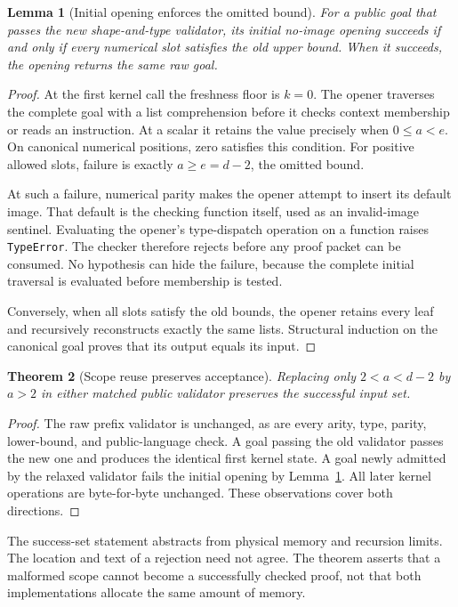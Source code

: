 \documentclass[11pt]{article}
\newtheorem{theorem}{Theorem}[section]
\newtheorem{lemma}[theorem]{Lemma}
\theoremstyle{definition}\newtheorem{definition}[theorem]{Definition}
\theoremstyle{remark}\newtheorem{remark}[theorem]{Remark}
\begin{document}
\begin{lemma}[Initial opening enforces the omitted bound]
\label{lem:scope}
For a public goal that passes the new shape-and-type validator, its
initial no-image opening succeeds if and only if every numerical slot
satisfies the old upper bound. When it succeeds, the opening returns the
same raw goal.
\end{lemma}
\begin{proof}
At the first kernel call the freshness floor is $k=0$. The opener
traverses the complete goal with a list comprehension before it checks
context membership or reads an instruction. At a scalar it retains the
value precisely when $0\leq a<e$. On canonical numerical positions,
zero satisfies this condition. For positive allowed slots, failure is
exactly $a\geq e=d-2$, the omitted bound.

At such a failure, numerical parity makes the opener attempt to insert
its default image. That default is the checking function itself, used
as an invalid-image sentinel. Evaluating the opener's type-dispatch
operation on a function raises \texttt{TypeError}. The checker therefore
rejects before any proof packet can be consumed. No hypothesis can
hide the failure, because the complete initial traversal is evaluated
before membership is tested.

Conversely, when all slots satisfy the old bounds, the opener retains
every leaf and recursively reconstructs exactly the same lists. Structural
induction on the canonical goal proves that its output equals its input.
\end{proof}

\begin{theorem}[Scope reuse preserves acceptance]
Replacing only $2<a<d-2$ by $a>2$ in either matched public validator
preserves the successful input set.
\end{theorem}
\begin{proof}
The raw prefix validator is unchanged, as are every arity, type, parity,
lower-bound, and public-language check. A goal passing the old validator
passes the new one and produces the identical first kernel state. A goal
newly admitted by the relaxed validator fails the initial opening by
Lemma~\ref{lem:scope}. All later kernel operations are byte-for-byte
unchanged. These observations cover both directions.
\end{proof}

The success-set statement abstracts from physical memory and recursion
limits. The location and text of a rejection need not agree. The theorem
asserts that a malformed scope cannot become a successfully checked proof,
not that both implementations allocate the same amount of memory.
\end{document}
